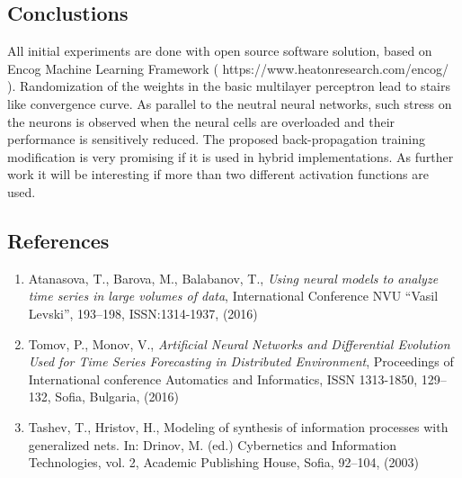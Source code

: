 \documentclass[a0,portrait,25pt]{sciposter}
\begin{document}
\begin{multicols}{3}
\begin{mdframed}[backgroundcolor=white,roundcorner=4pt,shadow=true,linewidth=1pt]
\color{Black}
\section*{Conclustions}
All initial experiments are done with open source software solution, based on Encog Machine Learning Framework ( https://www.heatonresearch.com/encog/ ). Randomization of the weights in the basic multilayer perceptron lead to stairs like convergence curve. As parallel to the neutral neural networks, such stress on the neurons is observed when the neural cells are overloaded and their performance is sensitively reduced. The proposed back-propagation training modification is very promising if it is used in hybrid implementations. As further work it will be interesting if more than two different activation functions are used. 
\end{mdframed}

\begin{mdframed}[backgroundcolor=white,roundcorner=4pt,shadow=true,linewidth=1pt]
\color{Black}
\section*{References}
\begin{enumerate}
\item Atanasova, T., Barova, M., Balabanov, T., \textit{Using neural models to analyze time series in large volumes of data}, International Conference  NVU “Vasil Levski”, 193--198, ISSN:1314-1937, (2016) 
\item Tomov, P., Monov, V., \textit{Artificial Neural Networks and Differential Evolution Used for Time Series Forecasting in Distributed Environment}, Proceedings of International conference Automatics and Informatics, ISSN 1313-1850, 129--132, Sofia, Bulgaria, (2016) 
\item Tashev, T., Hristov, H., Modeling of synthesis of information processes with generalized nets. In: Drinov, M. (ed.) Cybernetics and Information Technologies, vol. 2, Academic Publishing House, Sofia, 92–104, (2003) 
\end{enumerate}
\end{mdframed}

\begin{mdframed}[backgroundcolor=white,roundcorner=4pt,shadow=true,linewidth=1pt]

\end{mdframed}
\end{multicols}
\end{document}
